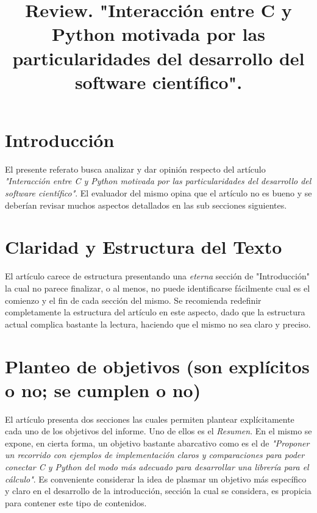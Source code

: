 \documentclass[osajnl,twocolumn,showpacs,superscriptaddress,11pt]{revtex4-1} %
\begin{document}
\title{Review. "Interacción entre C y Python motivada por las particularidades del desarrollo del software científico".}


\begin{abstract}

\end{abstract}

\maketitle %

\section{Introducción}

El presente referato busca analizar y dar opinión respecto del artículo \textit{"Interacción entre C y Python motivada por las particularidades del desarrollo del software científico"}. El evaluador del mismo opina que el artículo no es bueno y se deberían revisar muchos aspectos detallados en las sub secciones siguientes. \\

\section{Claridad y Estructura del Texto}

El artículo carece de estructura presentando una \textit{eterna} sección de "Introducción" la cual no parece finalizar, o al menos, no puede identificarse fácilmente cual es el comienzo y el fin de cada sección del mismo. Se recomienda redefinir completamente la estructura del artículo en este aspecto, dado que la estructura actual complica bastante la lectura, haciendo que el mismo no sea claro y preciso. \\

\section{Planteo de objetivos (son explícitos o no; se cumplen o no)}

El artículo presenta dos secciones las cuales permiten plantear explícitamente cada uno de los objetivos del informe. Uno de ellos es el \textit{Resumen}. En el mismo se expone, en cierta forma, un objetivo bastante abarcativo como es el de \textit{"Proponer un recorrido con ejemplos de implementación
claros y comparaciones para poder conectar C y Python del modo más adecuado para desarrollar una librería para el cálculo"}. Es conveniente considerar la idea de plasmar un objetivo más específico y claro en el desarrollo de la introducción, sección la cual se considera, es propicia para contener este tipo de contenidos. \\
\end{document}
